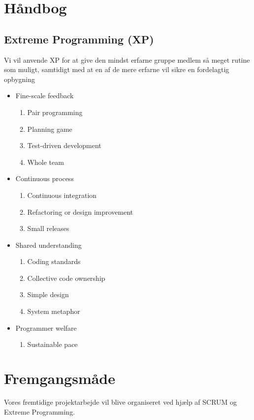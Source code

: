 \documentclass[11pt]{article}
\begin{document}
\section{Håndbog}
    \subsection{Extreme Programming (XP)}
    Vi vil anvende XP for at give den mindst erfarne gruppe medlem så meget rutine som muligt, samtidigt med at en af de mere erfarne vil sikre en fordelagtig opbygning  
    \begin{itemize}
        \item Fine-scale feedback
        \begin{enumerate}
            \item Pair programming
            \item Planning game
            \item Test-driven development
            \item Whole team
        \end{enumerate}
        \item Continuous process
        \begin{enumerate}
            \item Continuous integration
            \item Refactoring or design improvement
            \item Small releases
        \end{enumerate}
        \item Shared understanding
        \begin{enumerate}
            \item Coding standards
            \item Collective code ownership
            \item Simple design
            \item System metaphor
        \end{enumerate}
        \item Programmer welfare
        \begin{enumerate}
            \item Sustainable pace
        \end{enumerate}
    \end{itemize}
\section{Fremgangsmåde}
\noindent
Vores fremtidige projektarbejde vil blive organiseret ved hjælp af SCRUM og Extreme Programming. 
\end{document}
